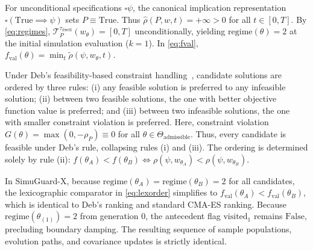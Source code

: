 \documentclass[journal]{IEEEtran}
\begin{document}
\begin{IEEEproof}
For unconditional specifications $\square \psi$, the canonical implication representation $\square(\mathrm{True} \implies \psi)$ sets $P \equiv \mathrm{True}$. Thus $\hat{\rho}(P, w, t) = +\infty > 0$ for all $t \in [0, T]$. By \eqref{eq:regimes}, $\mathcal{T}_P^{\tau_{\text{dwell}}}(w_\theta) = [0, T]$ unconditionally, yielding $\mathrm{regime}(\theta) = 2$ at the initial simulation evaluation ($k=1$). In \eqref{eq:fval}, $f_{\mathrm{val}}(\theta) = \min_{t} \tilde{\rho}(\psi, w_\theta, t)$. 

Under Deb's feasibility-based constraint handling~\cite{deb2000efficient}, candidate solutions are ordered by three rules: (i) any feasible solution is preferred to any infeasible solution; (ii) between two feasible solutions, the one with better objective function value is preferred; and (iii) between two infeasible solutions, the one with smaller constraint violation is preferred. Here, constraint violation $G(\theta) = \max(0, -\rho_P) \equiv 0$ for all $\theta \in \Theta_{\text{admissible}}$. Thus, every candidate is feasible under Deb's rule, collapsing rules (i) and (iii). The ordering is determined solely by rule (ii): $f(\theta_A) < f(\theta_B) \iff \rho(\psi, w_{\theta_A}) < \rho(\psi, w_{\theta_B})$. 

In SimuGuard-X, because $\mathrm{regime}(\theta_A) = \mathrm{regime}(\theta_B) = 2$ for all candidates, the lexicographic comparator in \eqref{eq:lexorder} simplifies to $f_{\mathrm{val}}(\theta_A) < f_{\mathrm{val}}(\theta_B)$, which is identical to Deb's ranking and standard CMA-ES ranking. Because $\mathrm{regime}(\theta_{(1)}) = 2$ from generation 0, the antecedent flag $\mathrm{visited}_1$ remains $\mathrm{False}$, precluding boundary damping. The resulting sequence of sample populations, evolution paths, and covariance updates is strictly identical.
\end{IEEEproof}
\end{document}
